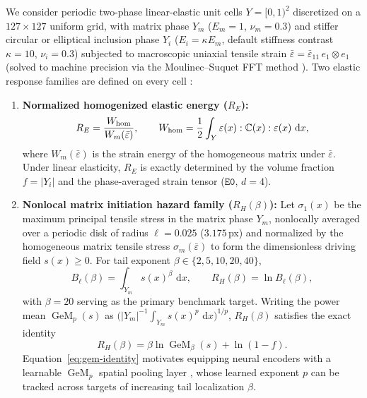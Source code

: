 \documentclass[preprint,11pt,a4paper]{elsarticle}
\newcommand{\dd}{\,\mathrm d}
\newcommand{\GeM}{\operatorname{GeM}}
\begin{document}
We consider periodic two-phase linear-elastic unit cells $Y=[0,1)^2$ discretized on a $127\times 127$ uniform grid, with matrix phase $Y_m$ ($E_m=1$, $\nu_m=0.3$) and stiffer circular or elliptical inclusion phase $Y_i$ ($E_i=\kappa E_m$, default stiffness contrast $\kappa=10$, $\nu_i=0.3$) subjected to macroscopic uniaxial tensile strain $\bar\varepsilon=\bar\varepsilon_{11}\,e_1\otimes e_1$ (solved to machine precision via the Moulinec--Suquet FFT method \cite{MoulinecSuquet1998}). Two elastic response families are defined on every cell \cite{GomezOvalle2026}:
\begin{enumerate}
    \item \textbf{Normalized homogenized elastic energy ($R_E$):}
    \begin{equation}
    R_E = \frac{W_{\rm hom}}{W_m(\bar\varepsilon)},
    \qquad
    W_{\rm hom} = \frac12\int_Y \varepsilon(x):\mathbb C(x):\varepsilon(x)\,\dd x,
    \end{equation}
    where $W_m(\bar\varepsilon)$ is the strain energy of the homogeneous matrix under $\bar\varepsilon$. Under linear elasticity, $R_E$ is exactly determined by the volume fraction $f=|Y_i|$ and the phase-averaged strain tensor ($\texttt{E0}$, $d=4$).
    \item \textbf{Nonlocal matrix initiation hazard family ($R_H(\beta)$):} Let $\sigma_1(x)$ be the maximum principal tensile stress in the matrix phase $Y_m$, nonlocally averaged over a periodic disk of radius $\ell=0.025$ ($3.175$\,px) and normalized by the homogeneous matrix tensile stress $\sigma_m(\bar\varepsilon)$ to form the dimensionless driving field $s(x)\ge 0$. For tail exponent $\beta\in\{2,5,10,20,40\}$,
    \begin{equation}
    B_\ell(\beta) = \int_{Y_m} s(x)^\beta\,\dd x,
    \qquad
    R_H(\beta) = \ln B_\ell(\beta),
    \end{equation}
    with $\beta=20$ serving as the primary benchmark target. Writing the power mean $\GeM_p(s)$ as $\big(|Y_m|^{-1}\int_{Y_m}s(x)^p\,\dd x\big)^{1/p}$, $R_H(\beta)$ satisfies the exact identity
    \begin{equation}
    R_H(\beta) = \beta\ln\GeM_\beta(s) + \ln(1-f).
    \label{eq:gem-identity}
    \end{equation}
    Equation~\eqref{eq:gem-identity} motivates equipping neural encoders with a learnable $\GeM_p$ spatial pooling layer \cite{GeM2019}, whose learned exponent $p$ can be tracked across targets of increasing tail localization $\beta$.
\end{enumerate}
\end{document}
